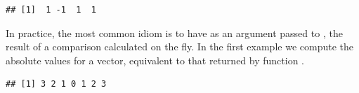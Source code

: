 \documentclass[krantz2]{krantz}\usepackage{knitr}
\begin{document}
\begin{knitrout}\footnotesize
{}\color{fgcolor}\begin{kframe}
\begin{alltt}
 \hlkwb{<-} \hlstd{(}\hlstd{,} \hlstd{,} \hlstd{,} \hlstd{)}
\hlstd{(}   \hlstd{=} \hlstd{,}  \hlstd{=} \hlopt{-}\hlstd{)}
\end{alltt}
\begin{verbatim}
## [1]  1 -1  1  1
\end{verbatim}
\end{kframe}
\end{knitrout}

In practice, the most common idiom is to have as an argument passed to , the result of a comparison calculated on the fly. In the first example we compute the absolute values for a vector, equivalent to that returned by \Rlang function .

\begin{knitrout}\footnotesize
{}\color{fgcolor}\begin{kframe}
\begin{alltt}
 \hlkwb{<-} \hlopt{-}\hlopt{:+}
 \hlopt{<} \hlstd{,} \hlopt{-}
\end{alltt}
\begin{verbatim}
## [1] 3 2 1 0 1 2 3
\end{verbatim}
\end{kframe}
\end{knitrout}
\end{document}
